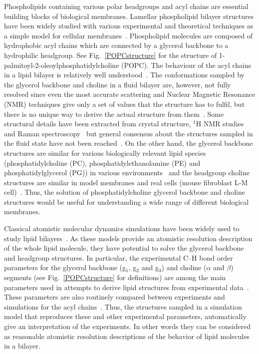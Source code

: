 \documentclass[pre,aps,floatfix,authordate1-4,twocolumn]{revtex4-1}
\begin{document}
Phospholipids containing various polar headgroups and acyl chains are essential building blocks of 
biological membranes. Lamellar phospholipid bilayer structures have been widely studied with various experimental 
and theoretical techniques as a simple model for cellular membranes~\cite{lipowsky95,tieleman97,klauda08,edholm08,tieleman10,piggot12,rabinovich13,marsh13}. 
Phospholipid molecules are composed of hydrophobic acyl chains which are connected by a glycerol backbone to a hydrophilic headgroup.
See Fig.~\ref{POPCstructure} for the structure of 1-palmitoyl-2-oleoylphosphatidylcholine (POPC).
The behaviour of the acyl chains in a lipid bilayer is relatively well understood~\cite{Israelachvili80,lipowsky95,tieleman97,klauda08,edholm08,tieleman10,marsh13}. 
The conformations sampled by the glycerol backbone and choline in a fluid bilayer are, however, not fully 
resolved since even the most accurate scattering and Nuclear Magnetic Resonance (NMR)
techniques give only a set of values that the structure has to fulfil, but
there is no unique way to derive the actual structure from them~\cite{seelig77b,skarjune79,Israelachvili80,jacobs80,davis83,strenk85,akutsu91,hong95b,hong96,semchyschyn04}.
Some structural details have been extracted from crystal structure, $^1$H NMR studies and Raman spectroscopy~\cite{hauser80,hauser81,hauser81b,akutsu81b,pascher92,hauser88,marsh06}
but general consensus about the structures sampled in the fluid state have not been reached~\cite{seelig77b,skarjune79,Israelachvili80,jacobs80,davis83,strenk85,hauser88,akutsu91,hong95b,hong96,semchyschyn04,marsh06}. 
On the other hand, the glycerol backbone structures are similar for various biologically
relevant lipid species (phosphatidylcholine (PC), phosphatidylethanolamine (PE) and phosphatidylglycerol (PG)) 
in various environments~\cite{gally81} and the headgroup choline structures are similar in model membranes and
real cells (mouse fibroblast L-M cell)~\cite{scherer87}.
Thus, the solution of phosphatidylcholine glycerol backbone and choline structures would be 
useful for understanding a wide range of different biological membranes.

Classical atomistic molecular dynamics simulations have been widely used to study  
lipid bilayers~\cite{tieleman97,klauda08,edholm08,tieleman10,piggot12,rabinovich13}. As these models provide an atomistic
resolution description of the whole lipid molecule, they have potential to solve the glycerol backbone and 
headgroup structures. In particular, the experimental C--H bond order parameters for the glycerol backbone 
(g$_1$, g$_2$ and g$_3$) and choline ($\alpha$ and $\beta$) segments (see Fig.~\ref{POPCstructure} for definitions) are among the main parameters used in
attempts to derive lipid structures from experimental data~\cite{seelig77b,skarjune79,jacobs80,davis83,akutsu91,hong95b,semchyschyn04}.
These parameters are also routinely compared between experiments and simulations for the acyl chains~\cite{tieleman97,klauda08,edholm08,tieleman10,piggot12}.
Thus, the structures sampled in a simulation model that reproduces these and other experimental parameters, automatically
give an interpretation of the experiments. In other words they can be considered as reasonable atomistic resolution descriptions of
the behavior of lipid molecules in a bilayer.
\end{document}
